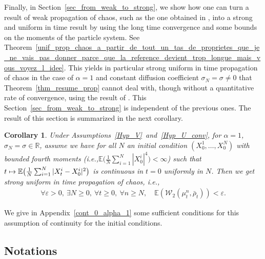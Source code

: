 \documentclass[11pt]{article}
\newcommand{\ie}{i.e.,\xspace}
\newcommand\mto{\mathchoice{\longmapsto}{\mapsto}{\mapsto}{\mapsto}}
\let\epsilon\varepsilon
\theoremstyle{plain}
\newtheorem{corollary}{Corollary}[section]
\theoremstyle{definition}
\begin{document}
Finally, in Section~\ref{sec_from_weak_to_strong}, we show how one can turn a result of weak propagation of chaos, such as the one obtained in \cite{Rogers_Shi, cepa_lepingle, Li_Li_Xie}, into a strong and uniform in time result by using the long time convergence and some bounds on the moments of the particle system. See Theorem~\ref{unif_prop_chaos_a_partir_de_tout_un_tas_de_proprietes_que_je_ne_vais_pas_donner_parce_que_la_reference_devient_trop_longue_mais_vous_voyez_l_idee}. This yields in particular strong uniform in time propagation of chaos in the case of $\alpha=1$ and constant diffusion coefficient $\sigma_N=\sigma\neq0$ that Theorem~\ref{thm_resume_prop} cannot deal with, though without a quantitative rate of convergence, using the result of \cite{cepa_lepingle}. This Section~\ref{sec_from_weak_to_strong} is independent of the previous ones. The result of this section is summarized in the next corollary.

\begin{corollary}
Under Assumptions~\ref{Hyp_V}~and~\ref{Hyp_U_conv}, for $\alpha=1$, $\sigma_N= \sigma\in\mathbb{R}$, assume we have for all $N$ an initial condition $(X^1_0,\dots,X^N_0)$ with bounded fourth moments (\ie $\mathbb{E}\bigl(\frac{1}{N}\sum_{i=1}^N|X^i_0|^4\bigr)<\infty$) such that ${t\mto\mathbb{E}\bigl(\frac{1}{N}\sum_{i=1}^N|X^i_t-X^i_0|^2\bigr)}$ is continuous in $t=0$ uniformly in $N$. Then we get strong uniform in time propagation of chaos, \ie
\begin{align*}
\forall \epsilon>0,\ \exists N\geq0,\ \forall t\geq0,\ \forall n\geq N,\quad \mathbb{E}\left(\mathcal{W}_2\left(\mu^n_t,\bar{\rho}_t\right)\right)<\epsilon.
\end{align*}
\end{corollary}

We give in Appendix~\ref{cont_0_alpha_1} some sufficient conditions for this assumption of continuity for the initial conditions.

\subsection*{Notations}
\end{document}
